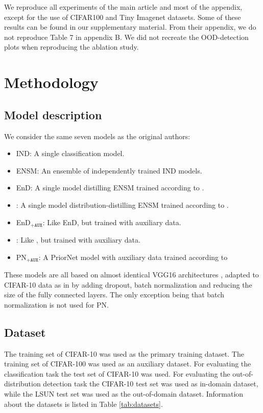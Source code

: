 We reproduce all experiments of the main article and most of the appendix, except for the use of CIFAR100 and Tiny Imagenet datasets. Some of these results can be found in our supplementary material. From their appendix, we do not reproduce Table 7 in appendix B. We did not recreate the OOD-detection plots when reproducing the ablation study.

\section{Methodology}
\label{sec:experiments-on-cifar-10}

\subsection{Model description}
We consider the same seven models as the original authors:
\begin{itemize}
    \item IND: A single classification model.
    \item ENSM: An ensemble of independently trained IND models.
    \item EnD: A single model distilling ENSM trained according to \cite{hinton2015distilling}. 
    \item \EnDD: A single model distribution-distilling ENSM trained according to \cite{malinin2019ensemble}.   
    \item EnD$_{\texttt{+AUX}}$: Like EnD, but trained with auxiliary data.
    \item \EnDDaux: Like \EnDD, but trained with auxiliary data.
    \item PN$_{\texttt{+AUX}}$: A PriorNet model with auxiliary data trained according to \cite{NIPS2018_7936}
\end{itemize}

These models are all based on almost identical VGG16 architectures \cite{VGG}, adapted to CIFAR-10 data as in \cite{NIPS2018_7936} by adding dropout, batch normalization and reducing the size of the fully connected layers. The only exception being that batch normalization is not used for PN. 

\subsection{Dataset}
The training set of CIFAR-10 was used as the primary training dataset. The training set of CIFAR-100 was used as an auxiliary dataset. For evaluating the classification task the test set of CIFAR-10 was used. For evaluating the out-of-distribution detection task the CIFAR-10 test set was used as in-domain dataset, while the LSUN test set was used as the out-of-domain dataset. Information about the datasets is listed in Table \ref{tab:datasets}.

